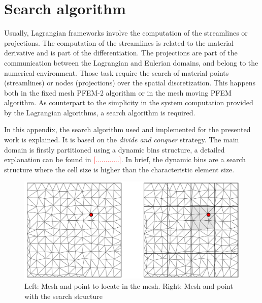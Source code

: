 
\chapter{Search algorithm}
\label{search_algorithm}



Usually, Lagrangian frameworks involve the computation of the streamlines or projections. The computation of the streamlines is related to the material derivative and is part of the differentiation. The projections are part of the communication between the Lagrangian and Eulerian domains, and belong to the numerical environment. Those task require the search of material points (streamlines) or nodes (projections) over the spatial discretization. This happens both in the fixed mesh PFEM-2 algorithm or in the mesh moving PFEM algorithm. As counterpart to the simplicity in the system computation provided by the Lagrangian algorithms, a search algorithm is required.

In this appendix, the search algorithm used and implemented for the presented work is explained. It is based on the \emph{divide and conquer} strategy. The main domain is firstly partitioned using a dynamic bins structure, a detailed explanation can be found in \textcolor{red}{[............]}. In brief, the dynamic bins are a search structure where the cell size is higher than the characteristic element size. 

\begin{figure}
    \centering
    \includegraphics[width=.9\textwidth]{img/search/bins_search.pdf}
    \caption{Left: Mesh and point to locate in the mesh. Right: Mesh and point with the search structure}
    \label{bins_search}
\end{figure}


